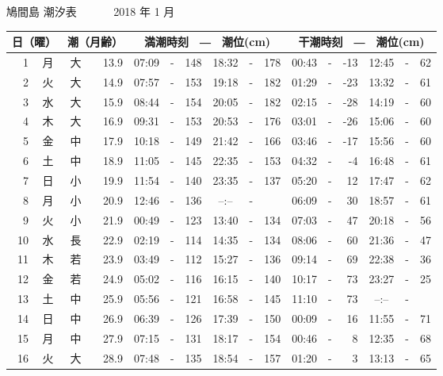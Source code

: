 \documentclass[12pt.a4j]{jsarticle}
\begin{document}
\pagestyle{empty}
 \begin{center}
 {\LARGE 鳩間島  潮汐表　　　}
 {\large 2018 年  1 月}\\
 \begin{table}[ht]
    \begin{tabular}{|rc|cr|ccrccr|ccrccr|}
    \hline
    \multicolumn{2}{|c|}{日（曜）} & \multicolumn{2}{c|}{潮（月齢）} & \multicolumn{6}{c|}{満潮時刻　―　潮位(cm)} & \multicolumn{6}{c|}{干潮時刻　―　潮位(cm)} \\
 \hline
 1 & 月 & 大 & 13.9 &  07:09 &-& 148  &  18:32 &-& 178  &   00:43 &-& -13  &   12:45 &-&  62  \\
 2 & 火 & 大 & 14.9 &  07:57 &-& 153  &  19:18 &-& 182  &   01:29 &-& -23  &   13:32 &-&  61  \\
 3 & 水 & 大 & 15.9 &  08:44 &-& 154  &  20:05 &-& 182  &   02:15 &-& -28  &   14:19 &-&  60  \\
 4 & 木 & 大 & 16.9 &  09:31 &-& 153  &  20:53 &-& 176  &   03:01 &-& -26  &   15:06 &-&  60  \\
 5 & 金 & 中 & 17.9 &  10:18 &-& 149  &  21:42 &-& 166  &   03:46 &-& -17  &   15:56 &-&  60  \\
 6 & 土 & 中 & 18.9 &  11:05 &-& 145  &  22:35 &-& 153  &   04:32 &-&  -4  &   16:48 &-&  61  \\
 7 & 日 & 小 & 19.9 &  11:54 &-& 140  &  23:35 &-& 137  &   05:20 &-&  12  &   17:47 &-&  62  \\
 8 & 月 & 小 & 20.9 &  12:46 &-& 136  &  --:-- &-&     &   06:09 &-&  30  &   18:57 &-&  61  \\
 9 & 火 & 小 & 21.9 &  00:49 &-& 123  &  13:40 &-& 134  &   07:03 &-&  47  &   20:18 &-&  56  \\
10 & 水 & 長 & 22.9 &  02:19 &-& 114  &  14:35 &-& 134  &   08:06 &-&  60  &   21:36 &-&  47  \\
11 & 木 & 若 & 23.9 &  03:49 &-& 112  &  15:27 &-& 136  &   09:14 &-&  69  &   22:38 &-&  36  \\
12 & 金 & 若 & 24.9 &  05:02 &-& 116  &  16:15 &-& 140  &   10:17 &-&  73  &   23:27 &-&  25  \\
13 & 土 & 中 & 25.9 &  05:56 &-& 121  &  16:58 &-& 145  &   11:10 &-&  73  &   --:-- &-&     \\
14 & 日 & 中 & 26.9 &  06:39 &-& 126  &  17:39 &-& 150  &   00:09 &-&  16  &   11:55 &-&  71  \\
15 & 月 & 中 & 27.9 &  07:15 &-& 131  &  18:17 &-& 154  &   00:46 &-&   8  &   12:35 &-&  68  \\
16 & 火 & 大 & 28.9 &  07:48 &-& 135  &  18:54 &-& 157  &   01:20 &-&   3  &   13:13 &-&  65  \\

\end{tabular}
\end{table}
\end{center}
\end{document}
